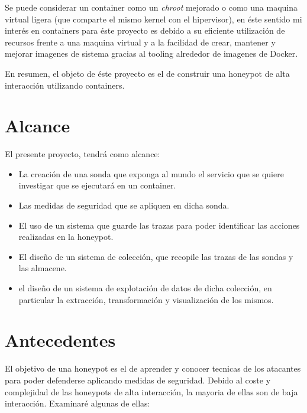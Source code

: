 Se puede considerar un container como un \emph{chroot} mejorado o como una maquina virtual ligera (que comparte el mismo kernel con el hipervisor), en éste sentido
mi interés en containers para éste proyecto es debido a su eficiente utilización de recursos frente a una maquina virtual y a la facilidad
de crear, mantener y mejorar imagenes de sistema gracias al tooling alrededor de imagenes de Docker.

En resumen, el objeto de éste proyecto es el de construir una honeypot de alta interacción utilizando containers.

\section{Alcance}

El presente proyecto, tendrá como alcance:
\begin{itemize}
    \item La creación de una sonda que exponga al mundo el servicio que se quiere investigar que se ejecutará en un container.
    \item Las medidas de seguridad que se apliquen en dicha sonda.
    \item El uso de un sistema que guarde las trazas para poder identificar las acciones realizadas en la honeypot.
    \item El diseño de un sistema de colección, que recopile las trazas de las sondas y las almacene.
    \item el diseño de un sistema de explotación de datos de dicha colección, en particular la extracción, transformación y visualización de los mismos.
\end{itemize}

\section{Antecedentes}


El objetivo de una honeypot es el de aprender y conocer tecnicas de los atacantes para poder defenderse aplicando medidas de seguridad.
Debido al coste y complejidad de las honeypots de alta interacción, la mayoria de ellas son de baja interacción. Examinaré algunas de ellas:

